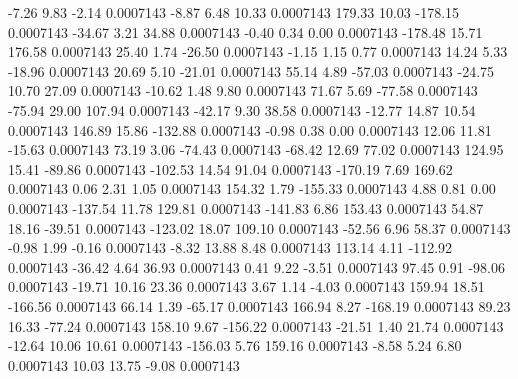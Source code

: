        -7.26        9.83       -2.14     0.0007143
       -8.87        6.48       10.33     0.0007143
      179.33       10.03     -178.15     0.0007143
      -34.67        3.21       34.88     0.0007143
       -0.40        0.34        0.00     0.0007143
     -178.48       15.71      176.58     0.0007143
       25.40        1.74      -26.50     0.0007143
       -1.15        1.15        0.77     0.0007143
       14.24        5.33      -18.96     0.0007143
       20.69        5.10      -21.01     0.0007143
       55.14        4.89      -57.03     0.0007143
      -24.75       10.70       27.09     0.0007143
      -10.62        1.48        9.80     0.0007143
       71.67        5.69      -77.58     0.0007143
      -75.94       29.00      107.94     0.0007143
      -42.17        9.30       38.58     0.0007143
      -12.77       14.87       10.54     0.0007143
      146.89       15.86     -132.88     0.0007143
       -0.98        0.38        0.00     0.0007143
       12.06       11.81      -15.63     0.0007143
       73.19        3.06      -74.43     0.0007143
      -68.42       12.69       77.02     0.0007143
      124.95       15.41      -89.86     0.0007143
     -102.53       14.54       91.04     0.0007143
     -170.19        7.69      169.62     0.0007143
        0.06        2.31        1.05     0.0007143
      154.32        1.79     -155.33     0.0007143
        4.88        0.81        0.00     0.0007143
     -137.54       11.78      129.81     0.0007143
     -141.83        6.86      153.43     0.0007143
       54.87       18.16      -39.51     0.0007143
     -123.02       18.07      109.10     0.0007143
      -52.56        6.96       58.37     0.0007143
       -0.98        1.99       -0.16     0.0007143
       -8.32       13.88        8.48     0.0007143
      113.14        4.11     -112.92     0.0007143
      -36.42        4.64       36.93     0.0007143
        0.41        9.22       -3.51     0.0007143
       97.45        0.91      -98.06     0.0007143
      -19.71       10.16       23.36     0.0007143
        3.67        1.14       -4.03     0.0007143
      159.94       18.51     -166.56     0.0007143
       66.14        1.39      -65.17     0.0007143
      166.94        8.27     -168.19     0.0007143
       89.23       16.33      -77.24     0.0007143
      158.10        9.67     -156.22     0.0007143
      -21.51        1.40       21.74     0.0007143
      -12.64       10.06       10.61     0.0007143
     -156.03        5.76      159.16     0.0007143
       -8.58        5.24        6.80     0.0007143
       10.03       13.75       -9.08     0.0007143
